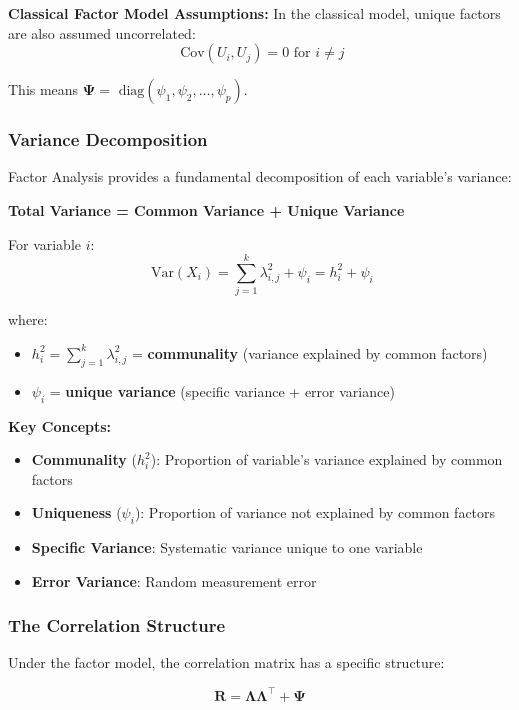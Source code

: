 \documentclass[
]{article}
\begin{document}
\textbf{Classical Factor Model Assumptions:} In the classical model,
unique factors are also assumed uncorrelated:
\[\text{ Cov}\left( U_{i},U_{j} \right) = 0\text{ for }i \neq j\]

This means
\(\mathbf{\Psi} = \text{ diag}\left( \psi_{1},\psi_{2},\ldots,\psi_{p} \right)\).

\subsubsection{Variance Decomposition}

Factor Analysis provides a fundamental decomposition of each variable's
variance:

\textbf{Total Variance = Common Variance + Unique Variance}

For variable \(i\):
\[\text{ Var}\left( X_{i} \right) = \sum_{j = 1}^{k}\lambda_{i,j}^{2} + \psi_{i} = h_{i}^{2} + \psi_{i}\]

where:

\begin{itemize}
\item
  \(h_{i}^{2} = \sum_{j = 1}^{k}\lambda_{i,j}^{2}\) =
  \textbf{communality} (variance explained by common factors)
\item
  \(\psi_{i}\) = \textbf{unique variance} (specific variance + error
  variance)
\end{itemize}

\textbf{Key Concepts:}

\begin{itemize}
\item
  \textbf{Communality} (\(h_{i}^{2}\)): Proportion of variable's
  variance explained by common factors
\item
  \textbf{Uniqueness} (\(\psi_{i}\)): Proportion of variance not
  explained by common factors
\item
  \textbf{Specific Variance}: Systematic variance unique to one variable
\item
  \textbf{Error Variance}: Random measurement error
\end{itemize}

\subsubsection{The Correlation Structure}

Under the factor model, the correlation matrix has a specific structure:

\[\mathbf{R} = \mathbf{\Lambda}\mathbf{\Lambda}^{\top} + \mathbf{\Psi}\]
\end{document}
